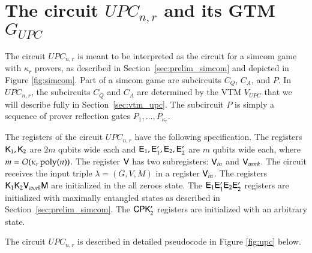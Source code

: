 \section{The circuit $UPC_{n,r}$ and its GTM $G_{UPC}$}
\label{sec:upc}

The circuit $UPC_{n,r}$ is meant to be interpreted as the circuit for a simcom game with $\kappa_r$ provers, as described in Section~\ref{sec:prelim_simcom} and depicted in Figure \ref{fig:simcom}. Part of a simcom game are subcircuits $C_Q$, $C_A$, and $P$. In $UPC_{n,r}$, the subcircuits $C_Q$ and $C_A$ are determined by the VTM $V_{UPC}$ that we will describe fully in Section~\ref{sec:vtm_upc}. The subcircuit $P$ is simply a sequence of prover reflection gates $P_1,\ldots,P_{\kappa_r}$. %

The registers of the circuit $UPC_{n,r}$ have the following specification. The registers ${\mathsf{K}}_1, {\mathsf{K}}_2$ are $2m$ qubits wide each and ${\mathsf{E}}_1,{\mathsf{E}}_1',{\mathsf{E}}_2,{\mathsf{E}}_2'$ are $m$ qubits wide each, where $m = O(\kappa_r \operatorname{poly}(n))$. The register ${\mathsf{V}}$ has two subregisters: ${\mathsf{V}}_{in}$ and ${\mathsf{V}}_{work}$. The circuit receives the input triple $\lambda = (G,V,M)$ in a register ${\mathsf{V}}_{in}$. The registers ${\mathsf{K}}_1 {\mathsf{K}}_2 {\mathsf{V}}_{work} {\mathsf{M}}$ are initialized in the all zeroes state. The ${\mathsf{E}}_1 {\mathsf{E}}_1' {\mathsf{E}}_2 {\mathsf{E}}_2'$ registers are initialized with maximally entangled states as described in Section~\ref{sec:prelim_simcom}. The ${\mathsf{C}} {\mathsf{P}} {\mathsf{K}}_2'$ registers are initialized with an arbitrary state.




The circuit $UPC_{n,r}$ is described in detailed pseudocode in Figure \ref{fig:upc} below.

